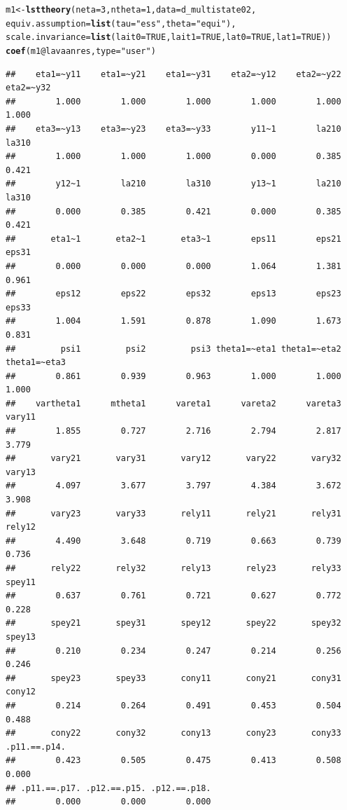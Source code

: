 \documentclass[10pt]{article}\usepackage[]{graphicx}\usepackage[]{xcolor}
\makeatletter
\newcommand{\hlnum}[1]{\textcolor[rgb]{0.686,0.059,0.569}{#1}}%
\newcommand{\hlstr}[1]{\textcolor[rgb]{0.192,0.494,0.8}{#1}}%
\newcommand{\hlopt}[1]{\textcolor[rgb]{0,0,0}{#1}}%
\newcommand{\hlstd}[1]{\textcolor[rgb]{0.345,0.345,0.345}{#1}}%
\newcommand{\hlkwb}[1]{\textcolor[rgb]{0.69,0.353,0.396}{#1}}%
\newcommand{\hlkwc}[1]{\textcolor[rgb]{0.333,0.667,0.333}{#1}}%
\newcommand{\hlkwd}[1]{\textcolor[rgb]{0.737,0.353,0.396}{\textbf{#1}}}%
\newenvironment{kframe}{%
 \def\at@end@of@kframe{}%
 \ifinner\ifhmode%
  \def\at@end@of@kframe{\end{minipage}}%
  \begin{minipage}{\columnwidth}%
 \fi\fi%
 \def\FrameCommand##1{\hskip\@totalleftmargin \hskip-\fboxsep
 \colorbox{shadecolor}{##1}\hskip-\fboxsep
     \hskip-\linewidth \hskip-\@totalleftmargin \hskip\columnwidth}%
 \MakeFramed {\advance\hsize-\width
   \@totalleftmargin\z@ \linewidth\hsize
   \@setminipage}}%
 {\par\unskip\endMakeFramed%
 \at@end@of@kframe}
\newenvironment{knitrout}{}{} %
\makeatother
\begin{document}
\begin{knitrout}
\color{fgcolor}\begin{kframe}
\begin{alltt}
\hlstd{m1} \hlkwb{<-} \hlkwd{lsttheory}\hlstd{(}\hlkwc{neta}\hlstd{=}\hlnum{3}\hlstd{,} \hlkwc{ntheta}\hlstd{=}\hlnum{1}\hlstd{,} \hlkwc{data}\hlstd{=d_multistate02,}
                \hlkwc{equiv.assumption}\hlstd{=}\hlkwd{list}\hlstd{(}\hlkwc{tau}\hlstd{=}\hlstr{"ess"}\hlstd{,} \hlkwc{theta}\hlstd{=}\hlstr{"equi"}\hlstd{),}
                \hlkwc{scale.invariance}\hlstd{=}\hlkwd{list}\hlstd{(}\hlkwc{lait0}\hlstd{=}\hlnum{TRUE}\hlstd{,} \hlkwc{lait1}\hlstd{=}\hlnum{TRUE}\hlstd{,} \hlkwc{lat0}\hlstd{=}\hlnum{TRUE}\hlstd{,} \hlkwc{lat1}\hlstd{=}\hlnum{TRUE}\hlstd{))}
\hlkwd{coef}\hlstd{(m1}\hlopt{@}\hlkwc{lavaanres}\hlstd{,} \hlkwc{type}\hlstd{=}\hlstr{"user"}\hlstd{)}
\end{alltt}
\begin{verbatim}
##    eta1=~y11    eta1=~y21    eta1=~y31    eta2=~y12    eta2=~y22    eta2=~y32 
##        1.000        1.000        1.000        1.000        1.000        1.000 
##    eta3=~y13    eta3=~y23    eta3=~y33        y11~1        la210        la310 
##        1.000        1.000        1.000        0.000        0.385        0.421 
##        y12~1        la210        la310        y13~1        la210        la310 
##        0.000        0.385        0.421        0.000        0.385        0.421 
##       eta1~1       eta2~1       eta3~1        eps11        eps21        eps31 
##        0.000        0.000        0.000        1.064        1.381        0.961 
##        eps12        eps22        eps32        eps13        eps23        eps33 
##        1.004        1.591        0.878        1.090        1.673        0.831 
##         psi1         psi2         psi3 theta1=~eta1 theta1=~eta2 theta1=~eta3 
##        0.861        0.939        0.963        1.000        1.000        1.000 
##    vartheta1      mtheta1      vareta1      vareta2      vareta3       vary11 
##        1.855        0.727        2.716        2.794        2.817        3.779 
##       vary21       vary31       vary12       vary22       vary32       vary13 
##        4.097        3.677        3.797        4.384        3.672        3.908 
##       vary23       vary33       rely11       rely21       rely31       rely12 
##        4.490        3.648        0.719        0.663        0.739        0.736 
##       rely22       rely32       rely13       rely23       rely33       spey11 
##        0.637        0.761        0.721        0.627        0.772        0.228 
##       spey21       spey31       spey12       spey22       spey32       spey13 
##        0.210        0.234        0.247        0.214        0.256        0.246 
##       spey23       spey33       cony11       cony21       cony31       cony12 
##        0.214        0.264        0.491        0.453        0.504        0.488 
##       cony22       cony32       cony13       cony23       cony33 .p11.==.p14. 
##        0.423        0.505        0.475        0.413        0.508        0.000 
## .p11.==.p17. .p12.==.p15. .p12.==.p18. 
##        0.000        0.000        0.000
\end{verbatim}
\end{kframe}
\end{knitrout}
\end{document}
